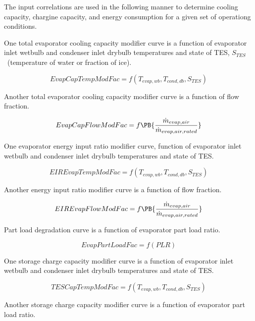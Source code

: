 The input correlations are used in the following manner to determine cooling capacity, chargine capacity, and energy consumption for a given set of operationg conditions.

One total evaporator cooling capacity modifier curve is a function of evaporator inlet wetbulb and condenser inlet drybulb temperatures and state of TES, \({S_{TES}}\) ~(temperature of water or fraction of ice).

\begin{equation}
EvapCapTempModFac = f\left( {{T_{evap,wb}},{T_{cond,db}},{S_{TES}}} \right)
\end{equation}

Another total evaporator cooling capacity modifier curve is a function of flow fraction.

\begin{equation}
EvapCapFlowModFac = f\PB{\frac{\dot{m}_{evap,air}}{\dot{m}_{evap,air,rated}}}
\end{equation}

One evaporator energy input ratio modifier curve, function of evaporator inlet wetbulb and condenser inlet drybulb temperatures and state of TES.

\begin{equation}
EIREvapTempModFac = f\left( {{T_{evap,wb}},{T_{cond,db}},{S_{TES}}} \right)
\end{equation}

Another energy input ratio modifier curve is a function of flow fraction.

\begin{equation}
EIREvapFlowModFac = f\PB{\frac{\dot{m}_{evap,air}}{\dot{m}_{evap,air,rated}}}
\end{equation}

Part load degradation curve is a function of evaporator part load ratio.

\begin{equation}
EvapPartLoadFac = f\left( {PLR} \right)
\end{equation}

One storage charge capacity modifier curve is a function of evaporator inlet wetbulb and condenser inlet drybulb temperatures and state of TES.

\begin{equation}
TESCapTempModFac = f\left( {{T_{evap,wb}},{T_{cond,db}},{S_{TES}}} \right)
\end{equation}

Another storage charge capacity modifier curve is a function of evaporator part load ratio.

